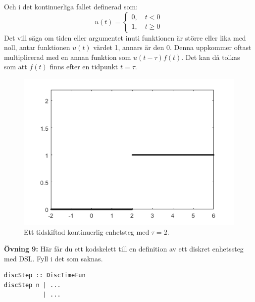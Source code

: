 \documentclass{article}
\begin{document}
Och i det kontinuerliga fallet definerad som:
$$
u(t) =
\begin{cases}
0, \quad t < 0 \\
1, \quad t \geq 0
\end{cases}
$$
Det vill säga om tiden eller argumentet inuti funktionen är större eller lika
med noll, antar funktionen $u(t)$ värdet 1, annars är den 0.
Denna uppkommer oftast multiplicerad med en annan funktion som
$u(t-\tau) f(t)$. Det kan då tolkas som att $f(t)$ finns efter en tidpunkt $t = \tau$.

\begin{figure}[ht]
\centerline{\includegraphics[scale=0.50]{shiftedHeavy.png}}
\caption{Ett tidskiftad kontinuerlig enhetsteg med $\tau = 2$.}
\label{}
\end{figure}

\textbf{Övning 9:} Här får du ett kodskelett till en definition av ett
diskret enhetssteg med DSL. Fyll i det som saknas.
\begin{verbatim}
discStep :: DiscTimeFun
discStep n | ...
           | ...
\end{verbatim}
\newpage
\end{document}
